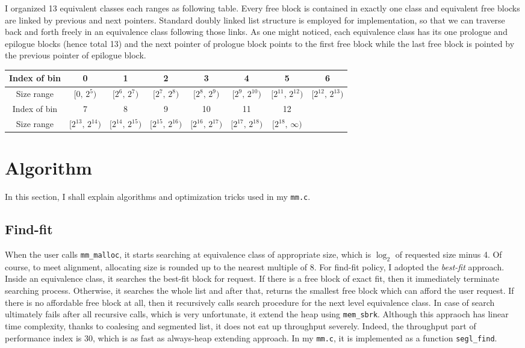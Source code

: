 \documentclass[fleqn]{article}
\begin{document}
I organized 13 equivalent classes each ranges as following table. Every free block is contained in exactly one class and equivalent free blocks are linked by previous and next pointers. Standard doubly linked list structure is employed for implementation, so that we can traverse back and forth freely in an equivalence class following those links. As one might noticed, each equivalence class has its one prologue and epilogue blocks (hence total 13) and the next pointer of prologue block points to the first free block while the last free block is pointed by the previous pointer of epilogue block.

\vspace{1em}
\noindent
\begin{tabularx}{\textwidth}{c|CCCCCCC}
    \hline
    Index of bin & 0 & 1 & 2 & 3 & 4 & 5 & 6\\
    \hline
    Size range & $[0,\,2^5)$ & $[2^6,\,2^7)$ & $[2^7,\,2^8)$ & $[2^8,\,2^9)$ & $[2^9,\,2^{10})$ & $[2^{11},\,2^{12})$ & $[2^{12},\,2^{13})$\\
    \hline
    \hline
    Index of bin & 7 & 8 & 9 & 10 & 11 & 12 &\\
    \hline
    Size range & $[2^{13},\,2^{14})$ & $[2^{14},\,2^{15})$ & $[2^{15},\,2^{16})$ & $[2^{16},\,2^{17})$ & $[2^{17},\,2^{18})$ & $[2^{18},\,\infty)$ & \\
    \hline
\end{tabularx}

\section{Algorithm}

In this section, I shall explain algorithms and optimization tricks used in my \texttt{mm.c}.

\subsection{Find-fit}

When the user calls \texttt{mm\_malloc}, it starts searching at equivalence class of appropriate size, which is $\log_2$ of requested size minus 4. Of course, to meet alignment, allocating size is rounded up to the nearest multiple of 8. For find-fit policy, I adopted the \textit{best-fit} approach. Inside an equivalence class, it searches the best-fit block for request. If there is a free block of exact fit, then it immediately terminate searching process. Otherwise, it searches the whole list and after that, returns the smallest free block which can afford the user request. If there is no affordable free block at all, then it recursively calls search procedure for the next level equivalence class. In case of search ultimately fails after all recursive calls, which is very unfortunate, it extend the heap using \texttt{mem\_sbrk}. Although this appraoch has linear time complexity, thanks to coalesing and segmented list, it does not eat up throughput severely. Indeed, the throughput part of performance index is 30, which is as fast as always-heap extending approach. In my \texttt{mm.c}, it is implemented as a function \texttt{segl\_find}.
\end{document}
